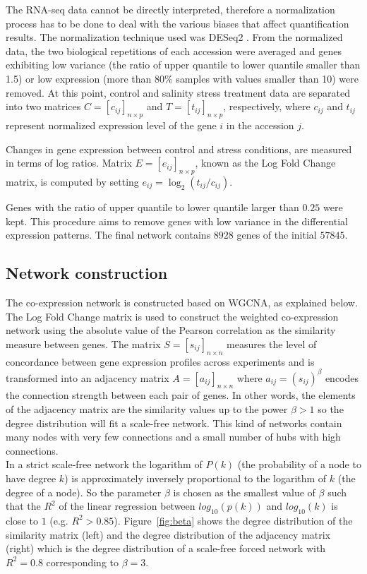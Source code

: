 \documentclass[journal, onecolumn]{IEEEtran}
\begin{document}
The RNA-seq data cannot be directly interpreted, therefore a normalization process has to be done to deal with the various biases that affect quantification results. The normalization technique used was DESeq2 \cite{love2014moderated}. From the normalized data, the two biological repetitions of each accession were averaged and genes exhibiting low variance (the ratio of upper quantile to lower quantile smaller than 1.5) or low expression (more than 80\% samples with values smaller than 10) were removed. At this point, control and salinity stress treatment data are separated into two matrices $C=[c_{ij}]_{n \times p}$ and $T=[t_{ij}]_{n \times p}$, respectively, where $c_{ij}$ and $t_{ij}$ represent normalized expression level of the gene $i$ in the accession $j$.

Changes in gene expression between control and stress conditions, are measured in terms of log ratios. Matrix $E=[e_{ij}]_{n \times p}$, known as the Log Fold Change matrix, is computed by setting $e_{ij}=\log_2 (t_{ij}/c_{ij})$. 

Genes with the ratio of upper quantile to lower quantile larger than $0.25$ were kept. This procedure aims to remove genes with low variance in the differential expression patterns. The final network contains $8928$ genes of the initial $57845$.


\subsection{Network construction}
The co-expression network is constructed based on WGCNA, as explained below.\\

The Log Fold Change matrix is used to construct the weighted co-expression network using the absolute value of the Pearson correlation as the similarity measure between genes. The matrix $S=[s_{ij}]_{n\times n}$ measures the level of concordance between gene expression profiles across experiments and is transformed into an adjacency matrix $A=[a_{ij}]_{n\times n}$ where $a_{ij} = (s_{ij})^\beta $ encodes the connection strength between each pair of genes. In other words, the elements of the adjacency matrix are the similarity values up to the power $\beta > 1$ so the degree distribution will fit a scale-free network. This kind of networks contain many nodes with very few connections and a small number of hubs with high connections. \\

In a strict scale-free network the logarithm of $P(k)$ (the probability of a node to have degree $k$) is approximately inversely proportional to the logarithm of $k$ (the degree of a node). So the parameter $\beta$ is chosen as the smallest value of $\beta$ such that the $R^2$ of the linear regression between $log_{10}(p(k))$ and $log_{10}(k)$ is close to $1$ (e.g. $R^2 > 0.85$). Figure~\ref{fig:beta} shows the degree distribution of the similarity matrix (left) and the degree distribution of the adjacency matrix (right) which is the degree distribution of a scale-free forced network with $R^2 = 0.8$ corresponding to $\beta = 3$.
\end{document}

